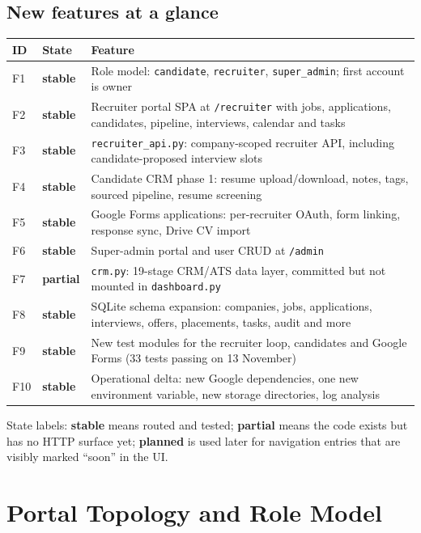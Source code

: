 \documentclass[11pt,a4paper]{article}
\newcommand{\file}[1]{\texttt{\small #1}}
\newcommand{\code}[1]{\texttt{#1}}
\newcommand{\st}[1]{{\footnotesize\bfseries\color{teal}#1}}
\begin{document}
\subsection{New features at a glance}
\begin{center}
\begin{tabular}{@{}llp{8.1cm}@{}}
\toprule
\textbf{ID} & \textbf{State} & \textbf{Feature}\\
\midrule
F1 & \st{stable} & Role model: \code{candidate}, \code{recruiter},
     \code{super\_admin}; first account is owner\\
F2 & \st{stable} & Recruiter portal SPA at \file{/recruiter} with jobs,
     applications, candidates, pipeline, interviews, calendar and tasks\\
F3 & \st{stable} & \file{recruiter\_api.py}: company-scoped recruiter API,
     including candidate-proposed interview slots\\
F4 & \st{stable} & Candidate CRM phase 1: resume upload/download, notes,
     tags, sourced pipeline, resume screening\\
F5 & \st{stable} & Google Forms applications: per-recruiter OAuth, form
     linking, response sync, Drive CV import\\
F6 & \st{stable} & Super-admin portal and user CRUD at \file{/admin}\\
F7 & \st{partial} & \file{crm.py}: 19-stage CRM/ATS data layer, committed but
     not mounted in \file{dashboard.py}\\
F8 & \st{stable} & SQLite schema expansion: companies, jobs, applications,
     interviews, offers, placements, tasks, audit and more\\
F9 & \st{stable} & New test modules for the recruiter loop, candidates and
     Google Forms (33 tests passing on 13 November)\\
F10 & \st{stable} & Operational delta: new Google dependencies, one new
     environment variable, new storage directories, log analysis\\
\bottomrule
\end{tabular}
\end{center}

State labels: \st{stable} means routed and tested; \st{partial} means the code
exists but has no HTTP surface yet; \st{planned} is used later for navigation
entries that are visibly marked ``soon'' in the UI.

\section{Portal Topology and Role Model}
\label{u:portals}
\end{document}

